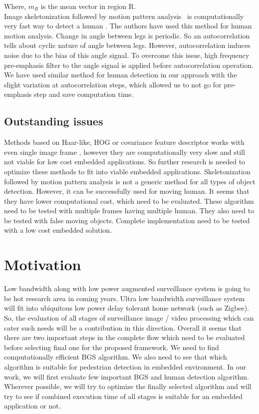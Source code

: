 Where, $m_R$ is the mean vector in region R.\\
\indent Image skeletonization followed by motion pattern analysis~\cite{32, 22, 31}
is computationally very fast way to detect a human .
The authors have used this method for human motion analysis. Change in angle
between legs is periodic. So an autocorrelation tells about cyclic
nature of angle between legs.  However, autocorrelation induces noise
due to the bias of this angle signal.  To overcome this issue, high
frequency pre-emphasis filter to the angle signal is applied before
autocorrelation operation. We have used similar method for human
detection in our approach with the slight variation at autocorrelation
steps, which allowed us to not go for pre-emphasis step and save
computation time.
\subsection{Outstanding issues}
\indent Methods based on Haar-like, HOG or covariance feature descriptor
works with even single image frame , however they are computationally
very slow and still not viable for low cost embedded applications. So
further research is needed to optimize these methods to fit into viable
embedded applications. Skeletonization followed by motion pattern
analysis is not a generic method for all types of object detection.
However, it can be successfully used for moving human. It seems that
they have lower computational cost, which need to be evaluated. These
algorithm need to be tested with multiple frames having multiple human.
They also need to be tested with false moving objects. Complete
implementation need to be tested with a low cost embedded solution.
\section{Motivation}
\indent Low bandwidth along with low power augmented surveillance system
is going to be hot research area in coming years. Ultra low bandwidth
surveillance system will fit into ubiquitous low power delay tolerant
home network (such as Zigbee). So, the evaluation of all stages of
surveillance image / video processing which can cater such needs will be
a contribution in this direction. Overall it seems that there are two
important steps in the complete flow which need to be evaluated before
selecting final one for the proposed framework. We need to find
computationally efficient BGS algorithm. We also need to see that which
algorithm is suitable for pedestrian detection in embedded environment.
In our work, we will first evaluate few important BGS and human
detection algorithm.  Wherever possible, we will try to optimize
the finally selected algorithm and will try to see if combined execution
time of all stages is suitable for an embedded application or not.
